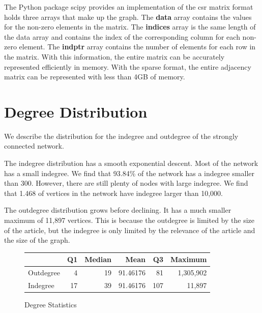 \documentclass{article}
\begin{document}
The Python package scipy provides an implementation of the csr matrix format holds three arrays that make up the graph. The \textbf{data} array contains the values for the non-zero elements in the matrix. The \textbf{indices} array is the same length of the data array and contains the index of the corresponding column for each non-zero element. The \textbf{indptr} array contains the number of elements for each row in the matrix. With this information, the entire matrix can be accurately represented efficiently in memory. With the sparse format, the entire adjacency matrix can be represented with less than 4GB of memory.




\section{Degree Distribution}

We describe the distribution for the indegree and outdegree of the strongly connected network.


The indegree distribution has a smooth exponential descent. Most of the network has a small indegree. We find that 93.84\% of the network has a indegree smaller than 300. However, there are still plenty of nodes with large indegree. We find that 1.468 of vertices in the network have indegree larger than 10,000.

The outdegree distribution grows before declining. It has a much smaller maximum of 11,897 vertices. This is because the outdegree is limited by the size of the article, but the indegree is only limited by the relevance of the article and the size of the graph.


\begin{figure}[H]
    \centering
    \caption[]{Degree Statistics}
    \begin{tabular}{lrrrrr}
        \toprule
        & Q1 & Median & Mean & Q3 & Maximum\\
        \midrule
        Outdegree & 4 & 19 & 91.46176 & 81 & 1,305,902\\
        Indegree & 17 & 39 & 91.46176 & 107 & 11,897\\
        \bottomrule
    \end{tabular}
\end{figure}
\end{document}
